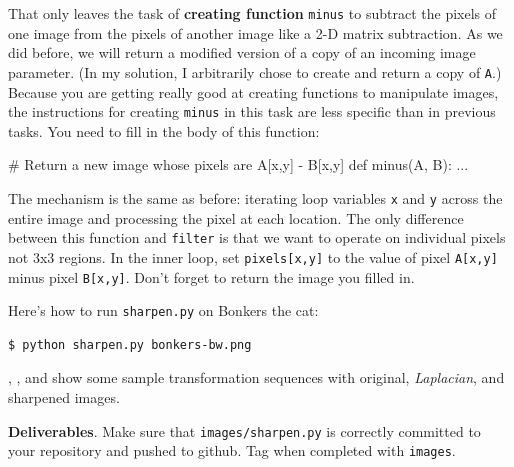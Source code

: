 That only leaves the task of {\bf creating function} {\tt minus} to subtract the pixels of one image from the pixels of another image like a 2-D matrix subtraction.  As we did before, we will return a modified version of a copy of an incoming image parameter. (In my solution, I arbitrarily chose to create and return a copy of {\tt A}.) Because you are getting really good at creating functions to manipulate images, the instructions for creating {\tt minus} in this  task are less specific than in previous tasks.  You need to fill in the body of this function:
 
\begin{pyverbatim}
# Return a new image whose pixels are A[x,y] - B[x,y]
def minus(A, B):
	...
\end{pyverbatim}

The mechanism is the same as before: iterating loop variables {\tt x} and {\tt y} across the entire image and processing the pixel at each location. The only difference between this function and {\tt filter} is that we want to operate on individual pixels not 3x3 regions.  In the inner loop, set {\tt pixels[x,y]} to the value of pixel {\tt A[x,y]} minus pixel {\tt B[x,y]}. Don't forget to return the image you filled in.

Here's how to run {\tt sharpen.py} on Bonkers the cat:

\begin{lstlisting}[style=BashInputStyle]
$ python sharpen.py bonkers-bw.png
\end{lstlisting}

\noindent {}, , and  show some sample transformation sequences with original, {\em Laplacian}, and sharpened images.

\begin{callout}{\bcplume}
{\bf Deliverables}. Make sure that {\tt images/sharpen.py} is correctly committed to your repository and pushed to github. Tag when completed with {\tt images}. 
\end{callout}

